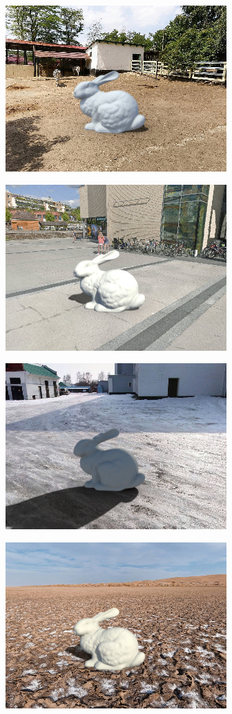 \begin{multicols}{3}
\includegraphics[width=\mywidth]{pano_amshyzgawxszwy.jpg}

\includegraphics[width=\mywidth]{pano_aojrzforebnjfs.jpg}

\includegraphics[width=\mywidth]{pano_apraeyhpkndfbl.jpg}

\includegraphics[width=\mywidth]{pano_aqfnsmhtrqbblm.jpg}


\end{multicols}
